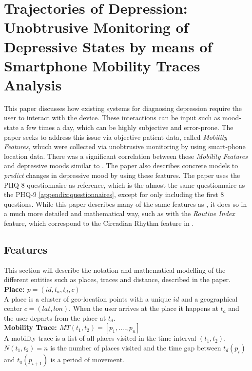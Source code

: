 \section{Trajectories of Depression: Unobtrusive Monitoring of Depressive States by means of Smartphone Mobility Traces Analysis} 
\cite{Canzian2015}
This paper discusses how existing systems for diagnosing depression require the user to interact with the device. These interactions can be input such as mood-state a few times a day, which can be highly subjective and error-prone. The paper seeks to address this issue via objective patient data, called \textit{Mobility Features}, whuch were collected via unobtrusive monitoring by using smart-phone location data. There was a significant correlation between these \textit{Mobility Features} and depressive moods similar to \cite{Saeb2015}. The paper also describes concrete models to \textit{predict} changes in depressive mood by using these features. The paper uses the PHQ-8 questionnaire as reference, which is the almost the same questionnaire as the PHQ-9 \ref{appendix:questionnaires}, except for only including the first 8 questions. While this paper describes many of the same features as \cite{Saeb2015}, it does so in a much more detailed and mathematical way, such as with the \textit{Routine Index} feature, which correspond to the Circadian Rhythm feature in \cite{Saeb2015}.

\subsection{Features}
This section will describe the notation and mathematical modelling of the different entities such as places, traces and distance, described in the paper.\\

\textbf{Place: $p = (id, t_a, t_d, c)$}\\
A place is a cluster of geo-location points with a unique $id$ and a geographical center $c = (lat, lon)$. When the user arrives at the place it happens at $t_a$ and the user departs from the place at $t_d$. \\

\textbf{Mobility Trace: $MT(t_1, t_2) = [p_1, ...., p_n]$}\\
A mobility trace is a list of all places visited in the time interval $(t_1, t_2)$. $N(t_1, t_2) = n$ is the number of places visited and the time gap between $t_d (p_i)$ and $t_a (p_{i+1})$ is a period of movement.\\

